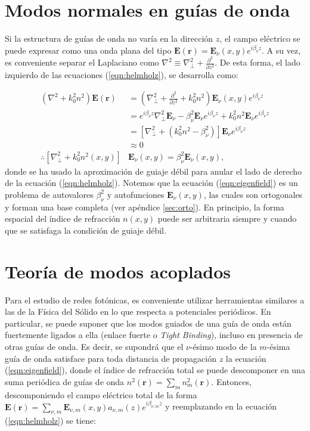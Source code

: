 \section{Modos normales en guías de onda}

Si la estructura de guías de onda no varía en la dirección $z$, el campo eléctrico se puede expresar como una onda plana del tipo $\textbf{E}(\textbf{r}) = \textbf{E}_\nu(x, y) e^{i\beta_\nu z}$. A su vez, es conveniente separar el Laplaciano como $\nabla^2 \equiv \nabla_\perp^2 + \frac{\partial^2}{\partial z^2}$. De esta forma, el lado izquierdo de las ecuaciones (\ref{eqn:helmholz}), se desarrolla como:

\begin{align}
	(\nabla^2  + k_0^2n^2) \textbf{E}(\textbf{r}) &= \left(\nabla_\perp^2 + \frac{\partial^2}{\partial z^2} + k_0^2n^2\right) \textbf{E}_\nu(x, y)  e^{i\beta_\nu z} \nonumber
\\	
	&= e^{i\beta_\nu z} \nabla_\perp^2 \textbf{E}_\nu -\beta_\nu^2\textbf{E}_\nu e^{i\beta_\nu z} + k_0^2n^2 \textbf{E}_\nu  e^{i\beta_\nu z}
\nonumber	
	\\	
	&= \left[  \nabla_\perp^2  + (k_0^2n^2-\beta_\nu^2) \right]\textbf{E}_\nu  e^{i\beta_\nu z}
	\nonumber	
	\\
	&\approx
	0
	\nonumber
	\\
	\therefore
	 \left[  \nabla_\perp^2  + k_0^2n^2(x,y) \right]&\textbf{E}_\nu(x,y)  = \beta_\nu^2 \textbf{E}_\nu(x,y), \label{eqn:eigenfield}
\end{align}
donde se ha usado la aproximación de guiaje débil para anular el lado de derecho de la ecuación (\ref{eqn:helmholz}). Notemos que la ecuación (\ref{eqn:eigenfield}) es un problema de autovalores $\beta_\nu^2$ y autofunciones $\textbf{E}_\nu(x,y)$, las cuales son ortogonales y forman una base completa (ver apéndice \ref{sec:orto}). En principio, la forma espacial del índice de refracción $n(x, y)$ puede ser arbitraria siempre y cuando que se satisfaga la condición de guiaje débil. 

\section{Teoría de modos acoplados}
	Para el estudio de redes fotónicas, es conveniente utilizar herramientas similares a las de la Física del Sólido en lo que respecta a potenciales periódicos. En particular, se puede suponer que los modos guiados de una guía de onda están fuertemente ligados a ella (enlace fuerte o \textit{Tight Binding}), incluso en presencia de otras guías de onda. Es decir, se supondrá que el $\nu$-ésimo modo de la $m$-ésima guía de onda satisface para toda distancia de propagación $z$ la ecuación (\ref{eqn:eigenfield}), donde el índice de refracción total se puede descomponer en una suma periódica de guías de onda $n^2(\textbf{r}) = \sum_{m} n^2_m(\textbf{r})$. Entonces, descomponiendo el campo eléctrico total de la forma $\textbf{E}(\textbf{r}) = \sum_{\nu, m} \textbf{E}_{\nu, m}(x, y) a_{\nu, m}(z) e^{i\beta_{\nu, m} z}$ y reemplazando en la ecuación (\ref{eqn:helmholz}) se tiene:

